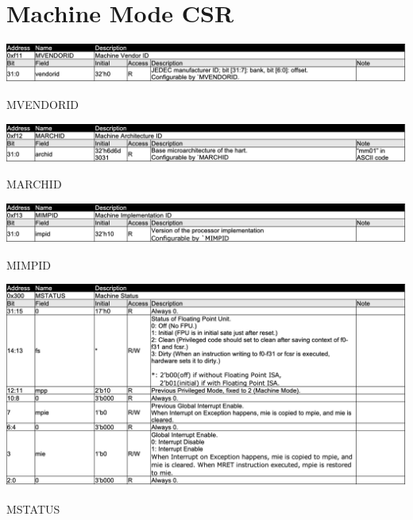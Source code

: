 \section{Machine Mode CSR}

\begin{table}[H]
    \includegraphics[width=1.00\columnwidth]{./Table/MVENDORID.png}
    \caption{MVENDORID}
    \label{tb:MVENDORID}
\end{table}

\begin{table}[H]
    \includegraphics[width=1.00\columnwidth]{./Table/MARCHID.png}
    \caption{MARCHID}
    \label{tb:MARCHID}
\end{table}

\begin{table}[H]
    \includegraphics[width=1.00\columnwidth]{./Table/MIMPID.png}
    \caption{MIMPID}
    \label{tb:MIMPID}
\end{table}

\begin{table}[H]
    \includegraphics[width=1.00\columnwidth]{./Table/MSTATUS.png}
    \caption{MSTATUS}
    \label{tb:MSTATUS}
\end{table}

